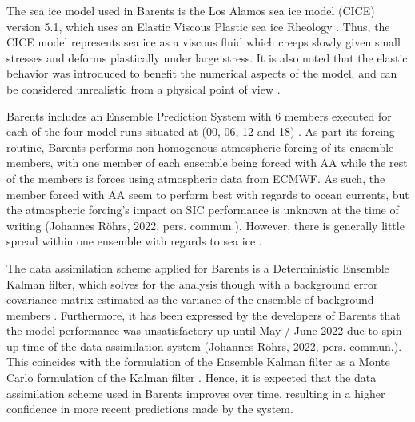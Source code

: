 \documentclass[../main/thesis.tex]{subfiles}
\begin{document}
The sea ice model used in Barents is the Los Alamos sea ice model (CICE) version 5.1, which uses an Elastic Viscous Plastic sea ice Rheology \cite{Hunke2015}. Thus, the CICE model represents sea ice as a viscous fluid which creeps slowly given small stresses and deforms plastically under large stress. It is also noted that the elastic behavior was introduced to benefit the numerical aspects of the model, and can be considered unrealistic from a physical point of view \cite{Hunke1997}.

Barents includes an Ensemble Prediction System with 6 members executed for each of the four model runs situated at (00, 06, 12 and 18) \cite{Roehrs2022}. As part its forcing routine, Barents performs non-homogenous atmospheric forcing of its ensemble members, with one member of each ensemble being forced with AA while the rest of the members is forces using atmospheric data from ECMWF. As such, the member forced with AA seem to perform best with regards to ocean currents, but the atmospheric forcing's impact on SIC performance is unknown at the time of writing (Johannes Röhrs, 2022, pers. commun.). However, there is generally little spread within one ensemble with regards to sea ice \cite{Roehrs2022}.

The data assimilation scheme applied for Barents is a Deterministic Ensemble Kalman filter, which solves for the analysis though with a background error covariance matrix estimated as the variance of the ensemble of background members \cite{Roehrs2022}. Furthermore, it has been expressed by the developers of Barents that the model performance was unsatisfactory up until May / June 2022 due to spin up time of the data assimilation system (Johannes Röhrs, 2022, pers. commun.). This coincides with the formulation of the Ensemble Kalman filter as a Monte Carlo formulation of the Kalman filter \cite{Sakov2008}. Hence, it is expected that the data assimilation scheme used in Barents improves over time, resulting in a higher confidence in more recent predictions made by the system.







\biblio
\end{document}
